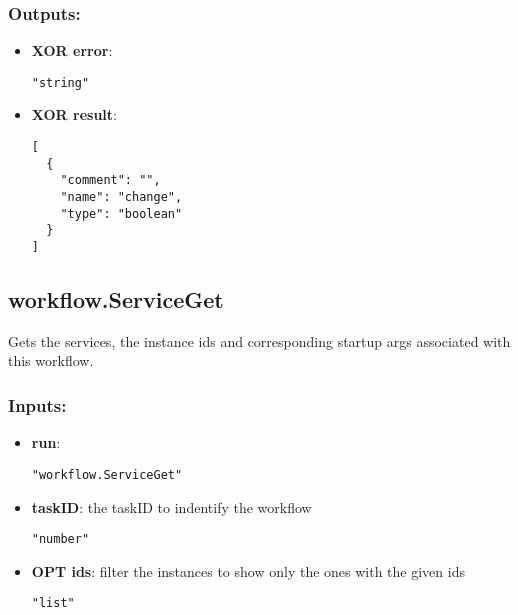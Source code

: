 \subsubsection*{Outputs:}
\begin{itemize}
    \item \textbf{XOR error}: 
\begin{lstlisting}
"string"
\end{lstlisting}
    \item \textbf{XOR result}: 
\begin{lstlisting}
[
  {
    "comment": "", 
    "name": "change", 
    "type": "boolean"
  }
]
\end{lstlisting}
  \end{itemize}

\subsection{workflow.ServiceGet}
Gets the services, the instance ids and corresponding startup args associated with this workflow.
\subsubsection*{Inputs:}
\begin{itemize}
    \item \textbf{run}: 
\begin{lstlisting}
"workflow.ServiceGet"
\end{lstlisting}
    \item \textbf{taskID}: the taskID to indentify the workflow
\begin{lstlisting}
"number"
\end{lstlisting}
    \item \textbf{OPT ids}: filter the instances to show only the ones with the given ids
\begin{lstlisting}
"list"
\end{lstlisting}
  \end{itemize}

